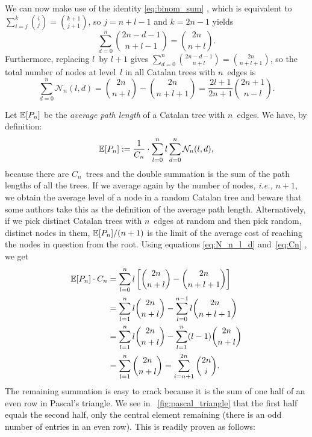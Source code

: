 We can now make use of the identity \eqref{eq:binom_sum}
, which is equivalent to
\(\sum_{i=j}^{k}\binom{i}{j} = \binom{k+1}{j+1}\), so
\(j=n+l-1\) and \(k=2n-1\) yields
\begin{equation*}
\sum_{d=0}^{n}\binom{2n-d-1}{n+l-1} = \binom{2n}{n+l}.
\end{equation*}
Furthermore, replacing \(l\)~by \(l+1\) gives
\(\sum_{d=0}^{n}\binom{2n-d-1}{n+l} = \binom{2n}{n+l+1}\), so the
total number of nodes at level~\(l\) in all Catalan trees with
\(n\)~edges is
\begin{equation}
\sum_{d=0}^{n}\mathcal{N}_n(l,d)
 = \binom{2n}{n+l} - \binom{2n}{n+l+1}
 = \frac{2l+1}{2n+1}\binom{2n+1}{n-l}.
\label{eq:N_n_l_d}
\end{equation}

Let \(\mathbb{E}[{P_n}]\) be the \emph{average path length} of a Catalan
tree with \(n\)~edges. We have, by definition:
\begin{equation*}
  \mathbb{E}[{P_n}] := \frac{1}{C_{n}} \cdot \sum_{l=0}^{n}l\sum_{d=0}^{n}\mathcal{N}_n(l,d),
\end{equation*}
because there are \(C_n\)~trees and the double summation is the sum of
the path lengths of all the trees. If we average again by the number
of nodes, \emph{i.e.,} \(n+1\), we obtain the average level of a node
in a random Catalan tree and beware that some authors take this as the
definition of the average path length. Alternatively, if we pick
distinct Catalan trees with \(n\)~edges at random and then pick
random, distinct nodes in them, \(\mathbb{E}[{P_n}]/(n+1)\) is the limit
of the average cost of reaching the nodes in question from the
root. Using equations \eqref{eq:N_n_l_d} and~\eqref{eq:Cn}
, we get
\begin{align*}
\mathbb{E}[{P_n}] \cdot C_n
 &= \sum_{l=0}^{n}l\left[\binom{2n}{n+l} - \binom{2n}{n+l+1}\right]\\
 &= \sum_{l=1}^{n}l \binom{2n}{n+l} - \sum_{l=0}^{n-1}l \binom{2n}{n+l+1}\\
 &= \sum_{l=1}^{n}l \binom{2n}{n+l} - \sum_{l=1}^{n}(l-1)\binom{2n}{n+l}\\
 &= \sum_{l=1}^{n}\binom{2n}{n+l}
  = \sum_{i=n+1}^{2n}\binom{2n}{i}.
\end{align*}
The remaining summation is easy to crack because it is the sum of one
half of an even row in Pascal's triangle. We see in
\fig~\vref{fig:pascal_triangle} that the first half equals the second
half, only the central element remaining (there is an odd number of
entries in an even row). This is readily proven as follows:
